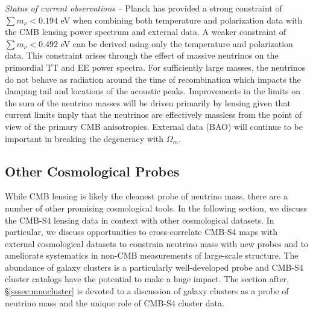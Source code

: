 {\it Status of current observations} -- Planck has provided a strong constraint of $\sum m_\nu < 0.194$ eV when combining both temperature and polarization data with the CMB lensing power spectrum and external data.  A weaker constraint of $\sum m_\nu < 0.492$ eV can be derived using only the temperature and polarization data.  This constraint arises through the effect of massive neutrinos on the primordial TT and EE power spectra.  For sufficiently large masses, the neutrinos do not behave as radiation around the time of recombination which impacts the damping tail and locations of the acoustic peaks.  Improvements in the limits on the sum of the neutrino masses will be driven primarily by lensing given that current limits imply that the neutrinos are effectively massless from the point of view of the primary CMB anisotropies.  External data (BAO) will continue to be important in breaking the degeneracy with $\Omega_m$.  

\subsection{Other Cosmological Probes}

While CMB lensing is likely the cleanest probe of neutrino mass, there are a number of other promising cosmological tools. In the following section, we discuss the CMB-S4 lensing data in context with other cosmological datasets. In particular, we discuss opportunities to cross-correlate CMB-S4 maps with external cosmological datasets to constrain neutrino mass with new probes and to ameliorate systematics in non-CMB measurements of large-scale structure. The abundance of galaxy clusters is a particularly well-developed probe and CMB-S4 cluster catalogs have the potential to make a huge impact. The section after, \S\ref{sssec:mnucluster} is devoted to a discussion of galaxy clusters as a probe of neutrino mass and the unique role of CMB-S4 cluster data.

